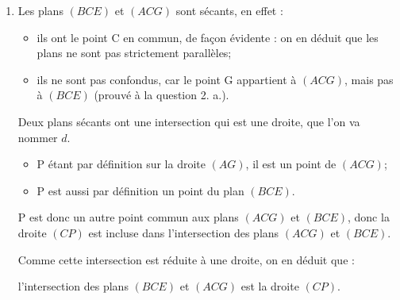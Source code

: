 \documentclass[10pt]{article}
\begin{document}
\begin{enumerate}
\item Les plans $(BCE)$ et $(ACG)$ sont sécants, en effet :
\begin{itemize}
\item ils ont le point C en commun, de façon évidente : on en déduit que les plans ne sont pas strictement parallèles;
\item ils ne sont pas confondus, car le point G appartient à $(ACG)$, mais pas à $(BCE)$ (prouvé à la question 2. a.).
\end{itemize}
Deux plans sécants ont une intersection qui est une droite, que l'on va nommer $d$.
\begin{itemize}
\item P étant par définition sur la droite $(AG)$, il est un point de $(ACG)$;
\item P est aussi par définition un point du plan $(BCE)$.
\end{itemize}
P est donc un autre point commun aux plans $(ACG)$ et $(BCE)$, donc la droite $(CP)$ est incluse dans l'intersection des plans $(ACG)$ et $(BCE)$.

Comme cette intersection est réduite à une droite, on en déduit que :

l'intersection des plans $(BCE)$ et $(ACG)$ est la droite $(CP)$.
\end{enumerate}
\end{document}
